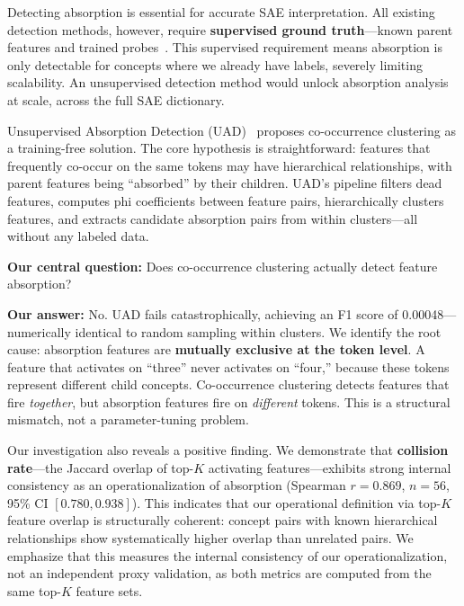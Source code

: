 \documentclass{article}
\begin{document}
Detecting absorption is essential for accurate SAE interpretation. All existing detection methods, however, require \textbf{supervised ground truth}---known parent features and trained probes~\citep{chanin2024absorption, karvonen2025causal}. This supervised requirement means absorption is only detectable for concepts where we already have labels, severely limiting scalability. An unsupervised detection method would unlock absorption analysis at scale, across the full SAE dictionary.

Unsupervised Absorption Detection (UAD)~\citep{chanin2024absorption} proposes co-occurrence clustering as a training-free solution. The core hypothesis is straightforward: features that frequently co-occur on the same tokens may have hierarchical relationships, with parent features being ``absorbed'' by their children. UAD's pipeline filters dead features, computes phi coefficients between feature pairs, hierarchically clusters features, and extracts candidate absorption pairs from within clusters---all without any labeled data.

\textbf{Our central question:} Does co-occurrence clustering actually detect feature absorption?

\textbf{Our answer:} No. UAD fails catastrophically, achieving an F1 score of 0.00048---numerically identical to random sampling within clusters. We identify the root cause: absorption features are \textbf{mutually exclusive at the token level}. A feature that activates on ``three'' never activates on ``four,'' because these tokens represent different child concepts. Co-occurrence clustering detects features that fire \emph{together}, but absorption features fire on \emph{different} tokens. This is a structural mismatch, not a parameter-tuning problem.

Our investigation also reveals a positive finding. We demonstrate that \textbf{collision rate}---the Jaccard overlap of top-$K$ activating features---exhibits strong internal consistency as an operationalization of absorption (Spearman $r = 0.869$, $n = 56$, 95\% CI $[0.780, 0.938]$). This indicates that our operational definition via top-$K$ feature overlap is structurally coherent: concept pairs with known hierarchical relationships show systematically higher overlap than unrelated pairs. We emphasize that this measures the internal consistency of our operationalization, not an independent proxy validation, as both metrics are computed from the same top-$K$ feature sets.
\end{document}
